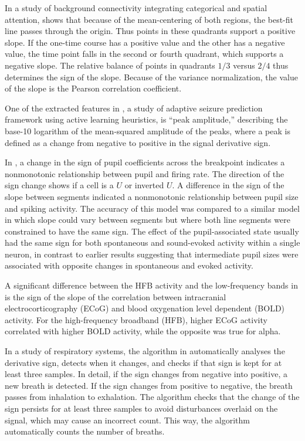 \documentclass[11pt]{book}
\begin{document}
In a study of background connectivity integrating categorical and spatial attention, \cite{tompary2018attending} shows that because of the mean-centering
of both regions, the best-fit line
passes through the origin. Thus points in these quadrants support
a positive slope. If the one-time course has a positive value and
the other has a negative value, the time point falls in the second
or fourth quadrant, which supports a negative slope. The relative
balance of points in quadrants $1/3$ versus $2/4$ thus determines
the sign of the slope. Because of the variance normalization, the
value of the slope is the Pearson correlation coefficient. 

One of the extracted features in \cite{karuppiah2018towards}, a study of adaptive seizure prediction framework using active learning heuristics,
is ``peak amplitude,'' describing the base-10 logarithm of the mean-squared
amplitude of the peaks, where a peak is defined as a change from negative
to positive in the signal derivative sign. 

In \cite{schwartz2020pupil},
a change in the sign of pupil coefficients across the breakpoint indicates
a nonmonotonic relationship between pupil and firing rate. The direction
of the sign change shows if a cell is a $U$ or inverted $U$. A difference
in the sign of the slope between segments indicated a nonmonotonic
relationship between pupil size and spiking activity. The accuracy
of this model was compared to a similar model in which slope could
vary between segments but where both line segments were constrained
to have the same sign. The effect of the pupil-associated state usually
had the same sign for both spontaneous and sound-evoked activity within
a single neuron, in contrast to earlier results suggesting that intermediate
pupil sizes were associated with opposite changes in spontaneous and
evoked activity. 

A significant difference between the HFB
activity and the low-frequency bands in \cite{piantoni2021size} is
the sign of the slope of the correlation between  intracranial electrocorticography (ECoG) and blood oxygenation level dependent (BOLD) activity.
For the high-frequency broadband (HFB), higher ECoG activity correlated with higher BOLD activity,
while the opposite was true for alpha.

In a study of respiratory systems, the algorithm in \cite{benetazzo2014respiratory}
automatically analyses the derivative sign, detects when it changes,
and checks if that sign is kept for at least three samples. In detail,
if the sign changes from negative into positive, a new breath is detected.
If the sign changes from positive to negative, the breath passes from
inhalation to exhalation. The algorithm checks that the change of
the sign persists for at least three samples to avoid disturbances
overlaid on the signal, which may cause an incorrect count. This way,
the algorithm automatically counts the number of breaths.
\end{document}
